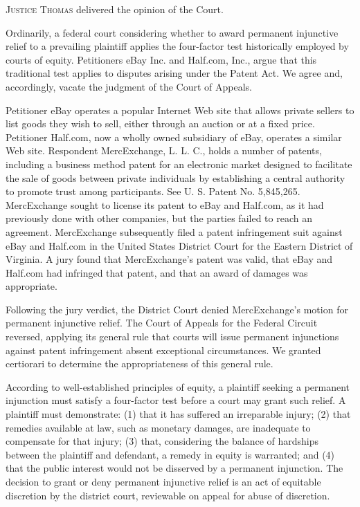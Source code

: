  


\opinion \textsc{Justice Thomas} delivered the opinion of the Court.

Ordinarily, a federal court considering whether to award permanent injunctive
relief to a prevailing plaintiff applies the four-factor test historically
employed by courts of equity. Petitioners eBay Inc. and Half.com, Inc., argue
that this traditional test applies to disputes arising under the Patent Act. We
agree and, accordingly, vacate the judgment of the Court of Appeals.




Petitioner eBay operates a popular Internet Web site that allows private sellers
to list goods they wish to sell, either through an auction or at a fixed price.
Petitioner Half.com, now a wholly owned subsidiary of eBay, operates a similar
Web site. Respondent MercExchange, L. L. C., holds a number of patents,
including a business method patent for an electronic market designed to
facilitate the sale of goods between private individuals by establishing a
central authority to promote trust among participants. See U. S. Patent No.
5,845,265. MercExchange sought to license its patent to eBay and Half.com, as it
had previously done with other companies, but the parties failed to reach an
agreement. MercExchange subsequently filed a patent infringement suit against
eBay and Half.com in the United States District Court for the Eastern District
of Virginia. A jury found that MercExchange's patent was valid, that eBay and
Half.com had infringed that patent, and that an award of damages was
appropriate.

Following the jury verdict, the District Court denied MercExchange's motion for
permanent injunctive relief. The Court of Appeals
for the Federal Circuit reversed, applying its general rule that courts will
issue permanent injunctions against patent infringement absent exceptional
circumstances. We granted certiorari to determine
the appropriateness of this general rule.



According to well-established principles of equity, a plaintiff seeking a
permanent injunction must satisfy a four-factor test before a court may grant
such relief. A plaintiff must demonstrate: (1) that it has suffered an
irreparable injury; (2) that remedies available at law, such as monetary
damages, are inadequate to compensate for that injury; (3) that, considering the
balance of hardships between the plaintiff and defendant, a remedy in equity is
warranted; and (4) that the public interest would not be disserved by a
permanent injunction. The decision to grant or
deny permanent injunctive relief is an act of equitable discretion by the
district court, reviewable on appeal for abuse of discretion.

